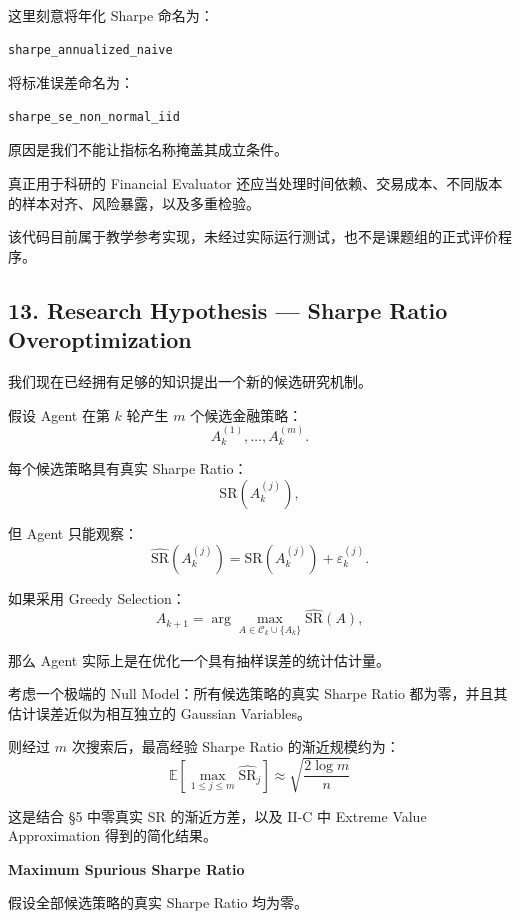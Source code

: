 这里刻意将年化 Sharpe 命名为：

\begin{verbatim}
sharpe_annualized_naive
\end{verbatim}

将标准误差命名为：

\begin{verbatim}
sharpe_se_non_normal_iid
\end{verbatim}

原因是我们不能让指标名称掩盖其成立条件。

真正用于科研的 Financial Evaluator 还应当处理时间依赖、交易成本、不同版本的样本对齐、风险暴露，以及多重检验。

该代码目前属于教学参考实现，未经过实际运行测试，也不是课题组的正式评价程序。

\hypertarget{part-4-67-0001-research-hypothesis-sharpe-ratio-overoptimization}{%
\subsection{13. Research Hypothesis --- Sharpe Ratio Overoptimization}\label{part-4-67-0001-research-hypothesis-sharpe-ratio-overoptimization}}

我们现在已经拥有足够的知识提出一个新的候选研究机制。

假设 Agent 在第 \(k\) 轮产生 \(m\) 个候选金融策略：
\[A_k^{(1)},\ldots,A_k^{(m)}.\]

每个候选策略具有真实 Sharpe Ratio：
\[\mathrm{SR}(A_k^{(j)}),\]

但 Agent 只能观察：
\[\widehat{\mathrm{SR}}(A_k^{(j)})
=
\mathrm{SR}(A_k^{(j)})
+
\varepsilon_k^{(j)}.\]

如果采用 Greedy Selection：
\[A_{k+1}
=
\arg\max_{A\in\mathcal C_k\cup\{A_k\}}
\widehat{\mathrm{SR}}(A),\]

那么 Agent 实际上是在优化一个具有抽样误差的统计估计量。

考虑一个极端的 Null Model：所有候选策略的真实 Sharpe Ratio 都为零，并且其估计误差近似为相互独立的 Gaussian Variables。

则经过 \(m\) 次搜索后，最高经验 Sharpe Ratio 的渐近规模约为：
\[\boxed{
\mathbb E\left[
\max_{1\leq j\leq m}
\widehat{\mathrm{SR}}_j
\right]
\approx
\sqrt{\frac{2\log m}{n}}
}\]

这是结合 §5 中零真实 SR 的渐近方差，以及 II-C 中 Extreme Value Approximation 得到的简化结果。

\textbf{Maximum Spurious Sharpe Ratio}

假设全部候选策略的真实 Sharpe Ratio 均为零。

